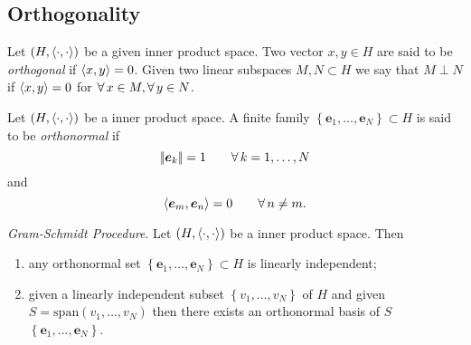 \documentclass{article}
\begin{document}
\subsection{Orthogonality}
\begin{definition}
	Let $\left(H,\langle \cdot,\cdot \rangle\right)$ be a given inner product space. Two vector $x,y\in H$ are said to be \emph{orthogonal} if $\langle x,y \rangle=0$. Given two linear subspaces $M,N\subset H$ we say that $M\perp N$ if $\langle x,y \rangle=0$ for $\forall\, x\in M,\forall\, y\in N$.
\end{definition}
\begin{definition}
	Let $\left(H,\langle \cdot,\cdot \rangle\right)$ be a inner product space. A finite family $\left\{\bm{e}_{1},\ldots,\bm{e}_{N}\right\}\subset H$ is said to be \emph{orthonormal} if
	\begin{equation*}
		\left|\negthinspace\left|\bm{e}_{k}\right|\negthinspace\right|=1\qquad\forall\, k=1,\ldots,N
	\end{equation*}
	and
	\begin{equation*}
		\langle \bm{e}_{m},\bm{e}_{n} \rangle=0\qquad\forall\, n\neq m.
	\end{equation*}
\end{definition}
\begin{proposition}
	\emph{Gram-Schmidt Procedure}. Let $\left(H,\langle \cdot,\cdot \rangle\right)$ be a inner product space. Then
	\begin{enumerate}
		\item any orthonormal set $\left\{\bm{e}_{1},\ldots,\bm{e}_{N}\right\}\subset H$ is linearly independent;
		\item given a linearly independent subset $\left\{v_{1},\ldots,v_{N}\right\}$ of $H$ and given $S=\mathrm{span}(v_{1},\ldots,v_{N})$ then there exists an orthonormal basis of $S$ $\left\{\bm{e}_{1},\ldots,\bm{e}_{N}\right\}$.
	\end{enumerate}
\end{proposition}
\end{document}
